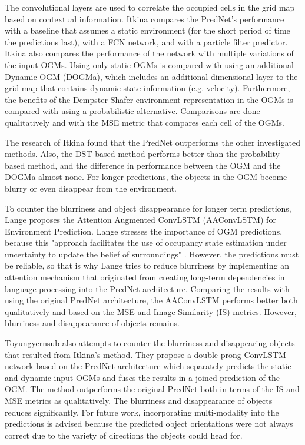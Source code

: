 The convolutional layers are used to correlate the occupied cells in the grid map based on contextual information.
Itkina \cite{itkina2019dynamic} compares the PredNet's performance with a baseline that assumes a static environment (for the short period of time the predictions last), with a FCN network, and with a particle filter predictor. Itkina \cite{itkina2019dynamic} also compares the performance of the network with multiple variations of the input \glspl{OGM}. Using only static \glspl{OGM} is compared with using an additional Dynamic OGM (DOGMa), which includes an additional dimensional layer to the grid map that contains dynamic state information (e.g. velocity). Furthermore, the benefits of the Dempster-Shafer environment representation in the \glspl{OGM} is compared with using a probabilistic alternative. Comparisons are done qualitatively and with the MSE metric that compares each cell of the \glspl{OGM}. 

The research of Itkina \cite{itkina2019dynamic} found that the PredNet outperforms the other investigated methods. Also, the DST-based method performs better than the probability based method, and the difference in performance between the OGM and the DOGMa almost none. For longer predictions, the objects in the OGM become blurry or even disappear from the environment. 

To counter the blurriness and object disappearance for longer term predictions, Lange \cite{lange2020attention} proposes the Attention Augmented ConvLSTM (AAConvLSTM) for Environment Prediction. Lange \cite{lange2020attention} stresses the importance of OGM predictions, because this "approach facilitates the use of occupancy state estimation under uncertainty to update the belief of surroundings" \cite{lange2020attention}. However, the predictions must be reliable, so that is why Lange \cite{lange2020attention} tries to reduce blurriness by implementing an attention mechanism that originated from creating long-term dependencies in language processing into the PredNet architecture. Comparing the results with using the original PredNet architecture, the AAConvLSTM performs better both qualitatively and based on the MSE and Image Similarity (IS) metrics. However, blurriness and disappearance of objects remains.

Toyungyernsub \cite{toyungyernsub2020double} also attempts to counter the blurriness and disappearing objects that resulted from Itkina's \cite{itkina2019dynamic} method. They propose a double-prong ConvLSTM network based on the PredNet architecture which separately predicts the static and dynamic input \glspl{OGM} and fuses the results in a joined prediction of the OGM. The method outperforms the original PredNet both in terms of the IS and MSE metrics as qualitatively. The blurriness and disappearance of objects reduces significantly. For future work, incorporating multi-modality into the predictions is advised because the predicted object orientations were not always correct due to the variety of directions the objects could head for.

